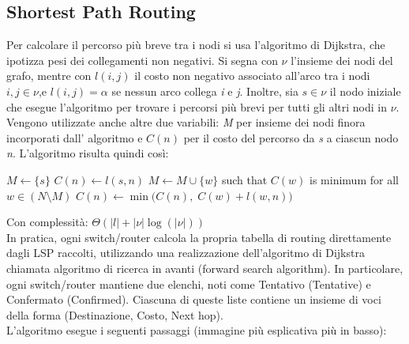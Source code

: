 \subsection{Shortest Path Routing}
Per calcolare il percorso più breve tra i nodi si usa l’algoritmo di Dijkstra, che ipotizza pesi dei collegamenti
non negativi. Si segna con $\nu$ l’insieme dei nodi del grafo, mentre con $l(i,j)$ il costo non negativo associato
all’arco tra i nodi $i,j \in \nu$,e $l(i,j) = \alpha$ se nessun arco collega \textit{i} e \textit{j}. Inoltre, sia $s \in \nu$ il nodo iniziale che esegue l’algoritmo per trovare i percorsi più brevi per tutti gli altri nodi in $\nu$. Vengono utilizzate anche altre due
variabili: \textit{M} per insieme dei nodi finora incorporati dall’ algoritmo e $C(n)$ per il costo del percorso da \textit{s} a ciascun nodo \textit{n}. L’algoritmo risulta quindi così:
\begin{algorithm}
\caption{Djikstra algorithm}
\begin{algorithmic}[1]
\State $M \gets \{s\}$
    \State $C(n) \gets l(s,n)$
\EndFor
{}
    \State $M \gets M \cup \{w\}$ such that $C(w)$ is minimum for all $w \in (N \setminus M)$
        \State $C(n) \gets \min\big(C(n),\; C(w) + l(w,n)\big)$
    \EndFor
\EndWhile
\end{algorithmic}
\end{algorithm}
Con complessità: $\Theta(|l|+|\nu|\log(|\nu|))$ \\
In pratica, ogni switch/router calcola la propria tabella di routing direttamente dagli LSP raccolti, utilizzando una realizzazione dell’algoritmo di Dijkstra chiamata algoritmo di ricerca in avanti (forward search algorithm). In particolare, ogni switch/router mantiene due elenchi, noti come Tentativo (Tentative) e Confermato (Confirmed). Ciascuna di queste liste contiene un insieme di voci della forma (Destinazione, Costo, Next hop). \\
L’algoritmo esegue i seguenti passaggi (immagine più esplicativa più in basso):
